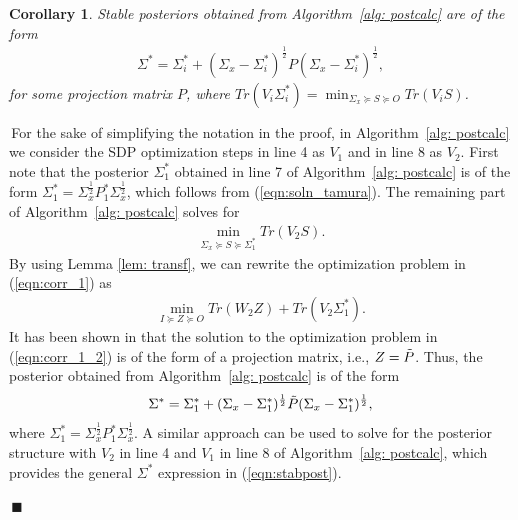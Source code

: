 \documentclass[12pt,journal,onecolumn]{IEEEtran}
\newtheorem{corollary}{Corollary}
\newenvironment{Proof}[1]{\medskip\par\noindent{\bf Proof:\,}\,#1}{{\mbox{\,$\blacksquare$}\par}}
\begin{document}
\begin{corollary}\label{cor: stabpost1}
Stable posteriors obtained from Algorithm~\ref{alg: postcalc} are of the form
\begin{align}\label{eqn:stabpost}
    \Sigma^*=\Sigma_i^*+(\Sigma_x-\Sigma_i^*)^{\frac{1}{2}}P(\Sigma_x-\Sigma_i^*)^{\frac{1}{2}},
\end{align}
for some projection matrix $P$, where $Tr(V_i\Sigma_i^*)=\min_{\Sigma_x\succeq S\succeq O}Tr(V_iS)$.
\end{corollary}
\begin{Proof}
For the sake of simplifying the notation in the proof, in Algorithm~\ref{alg: postcalc} we consider the SDP optimization steps in line 4 as $V_1$ and in line 8 as $V_2$. First note that the posterior $\Sigma_{1}^*$ obtained in line 7 of Algorithm~\ref{alg: postcalc} is of the form $\Sigma_{1}^*=\Sigma_x^{\frac{1}{2}}P_{1}^*\Sigma_x^\frac{1}{2}$, which follows from (\ref{eqn:soln_tamura}). The remaining part of Algorithm~\ref{alg: postcalc} solves for
\begin{align}\label{eqn:corr_1}
    \min_{\Sigma_x\succeq S\succeq\Sigma_{1}^*} Tr(V_{2}S).
\end{align}
By using Lemma \ref{lem: transf}, we can rewrite the optimization problem in (\ref{eqn:corr_1}) as 
\begin{align}\label{eqn:corr_1_2}
    \min_{I\succeq Z\succeq O} Tr(W_{2}Z)+ Tr(V_2\Sigma_{1}^*).
\end{align}
It has been shown in \cite{tamura2012theory,sayin2019hierarchical} that the solution to the optimization problem in (\ref{eqn:corr_1_2}) is of the form of a projection matrix, i.e., $Z=\Tilde{P}$. Thus, the posterior obtained from Algorithm~\ref{alg: postcalc} is of the form 
\begin{align}\label{eq: eqpost}
    \Sigma^*=\Sigma_1^*+(\Sigma_x-\Sigma_1^*)^{\frac{1}{2}}\Tilde{P}(\Sigma_x-\Sigma_1^*)^{\frac{1}{2}},
\end{align}
where $\Sigma_1^*=\Sigma_x^{\frac{1}{2}}P_1^*\Sigma_x^{\frac{1}{2}}$. A similar approach can be used to solve for the posterior structure with $V_2$ in line 4 and $V_1$ in line 8 of Algorithm~\ref{alg: postcalc}, which provides the general $ \Sigma^*$ expression in (\ref{eqn:stabpost}). 
\end{Proof}
\end{document}

